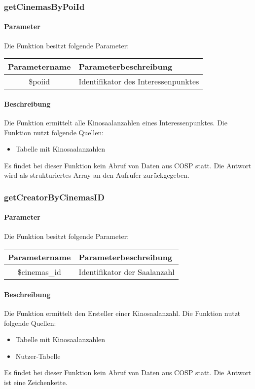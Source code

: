 \subsubsection{getCinemasByPoiId}
\paragraph{Parameter} Die Funktion besitzt folgende Parameter:
\begin{table}[H]
	\begin{tabular}{|c|p{11cm}|}
		\hline
		\textbf{Parametername} & \textbf{Parameterbeschreibung} \\ \hline
		\$poiid & Identifikator des Interessenpunktes \\ \hline
	\end{tabular}
\end{table}
\paragraph{Beschreibung} Die Funktion ermittelt alle Kinosaalanzahlen eines Interessenpunktes. Die Funktion nutzt folgende Quellen:
\begin{itemize}
	\item Tabelle mit Kinosaalanzahlen
\end{itemize}
Es findet bei dieser Funktion kein Abruf von Daten aus {\glqq COSP\grqq} statt. Die Antwort wird als strukturiertes Array an den Aufrufer zurückgegeben.
\subsubsection{getCreatorByCinemasID}
\paragraph{Parameter} Die Funktion besitzt folgende Parameter:
\begin{table}[H]
	\begin{tabular}{|c|p{11cm}|}
		\hline
		\textbf{Parametername} & \textbf{Parameterbeschreibung} \\ \hline
		\$cinemas\_id & Identifikator der Saalanzahl \\ \hline
	\end{tabular}
\end{table}
\paragraph{Beschreibung} Die Funktion ermittelt den Ersteller einer Kinosaalanzahl. Die Funktion nutzt folgende Quellen:
\begin{itemize}
	\item Tabelle mit Kinosaalanzahlen
	\item Nutzer-Tabelle
\end{itemize}
Es findet bei dieser Funktion kein Abruf von Daten aus {\glqq COSP\grqq} statt. Die Antwort ist eine Zeichenkette.
